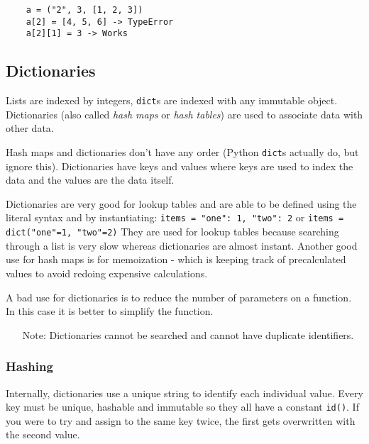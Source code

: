 \begin{verbatim}
    a = ("2", 3, [1, 2, 3])
    a[2] = [4, 5, 6] -> TypeError
    a[2][1] = 3 -> Works
\end{verbatim}

\subsection{Dictionaries}\label{sub:dictionaries}

Lists are indexed by integers, \texttt{dict}s are indexed with any immutable object.
Dictionaries (also called \emph{hash maps} or \emph{hash tables}) are used to associate data with other data.

Hash maps and dictionaries don't have any order (Python \texttt{dict}s actually do, but ignore this).
Dictionaries have keys and values where keys are used to index the data and the values are the data itself.

Dictionaries are very good for lookup tables and are able to be defined using the literal syntax and by instantiating: \texttt{items = {"one": 1, "two": 2}} or \texttt{items = dict("one"=1, "two"=2)}
They are used for lookup tables because searching through a list is very slow whereas dictionaries are almost instant.
Another good use for hash maps is for memoization - which is keeping track of precalculated values to avoid redoing expensive calculations.

A bad use for dictionaries is to reduce the number of parameters on a function.
In this case it is better to simplify the function.

\begin{note}
    \begin{itemize}
        \item[Note:] Dictionaries cannot be searched and cannot have duplicate identifiers.
    \end{itemize}
\end{note}

\subsubsection{Hashing}\label{ssub:hashing}

Internally, dictionaries use a unique string to identify each individual value.
Every key must be unique, hashable and immutable so they all have a constant \texttt{id()}.
If you were to try and assign to the same key twice, the first gets overwritten with the second value.

